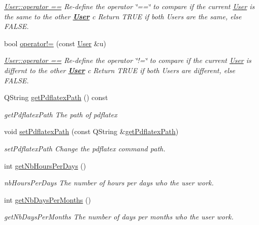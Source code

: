 \begin{DoxyCompactItemize}
\begin{DoxyCompactList}\small\item\em \hyperlink{classModels_1_1User_a60d18c2d1df053f1abf1215414f0b4b6}{User\-::operator ==} Re-\/define the operator \char`\"{}==\char`\"{} to compare if the current \hyperlink{classModels_1_1User}{User} is the same to the other {\bfseries \hyperlink{classModels_1_1User}{User}} {\itshape c} Return T\-R\-U\-E if both Users are the same, else F\-A\-L\-S\-E. \end{DoxyCompactList}\item 
bool \hyperlink{classModels_1_1User_aa1cdb1f752173aedd5f0c43edcb0b10b}{operator!=} (const \hyperlink{classModels_1_1User}{User} \&u)
\begin{DoxyCompactList}\small\item\em \hyperlink{classModels_1_1User_a60d18c2d1df053f1abf1215414f0b4b6}{User\-::operator ==} Re-\/define the operator \char`\"{}!=\char`\"{} to compare if the current \hyperlink{classModels_1_1User}{User} is differnt to the other {\bfseries \hyperlink{classModels_1_1User}{User}} {\itshape c} Return T\-R\-U\-E if both Users are different, else F\-A\-L\-S\-E. \end{DoxyCompactList}\item 
Q\-String \hyperlink{classModels_1_1User_ae8a894050c3e9266518707f6e5cd1c2f}{get\-Pdflatex\-Path} () const 
\begin{DoxyCompactList}\small\item\em get\-Pdflatex\-Path The path of pdflatex \end{DoxyCompactList}\item 
void \hyperlink{classModels_1_1User_ac65a44513c34f7e67888062d8bee3e54}{set\-Pdflatex\-Path} (const Q\-String \&\hyperlink{classModels_1_1User_ae8a894050c3e9266518707f6e5cd1c2f}{get\-Pdflatex\-Path})
\begin{DoxyCompactList}\small\item\em set\-Pdflatex\-Path Change the pdflatex command path. \end{DoxyCompactList}\item 
int \hyperlink{classModels_1_1User_acb46d721cae3c0a9059de32da0c33eaa}{get\-Nb\-Hours\-Per\-Days} ()
\begin{DoxyCompactList}\small\item\em nb\-Hours\-Per\-Days The number of hours per days who the user work. \end{DoxyCompactList}\item 
int \hyperlink{classModels_1_1User_a1ec672f16a5dbb248e05f2e957094c4d}{get\-Nb\-Days\-Per\-Months} ()
\begin{DoxyCompactList}\small\item\em get\-Nb\-Days\-Per\-Months The number of days per months who the user work. \end{DoxyCompactList}\end{DoxyCompactItemize}
